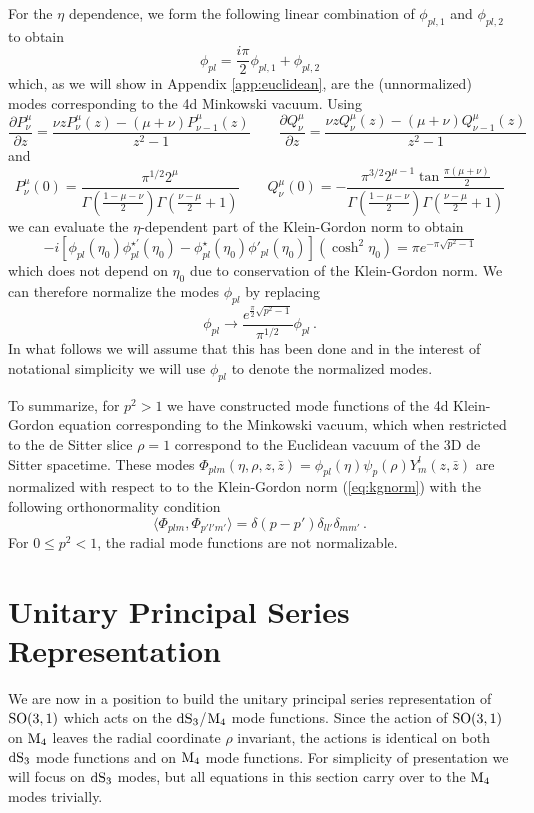 \documentclass{brownthesis}
\begin{document}
For the $\eta$ dependence, we form the following linear combination
of $\phi_{pl,1}$ and $\phi_{pl,2}$ to obtain
\[
\phi_{pl}=\frac{i\pi}{2}\phi_{pl,1}+\phi_{pl,2}
\]
which, as we will show in Appendix \ref{app:euclidean}, are the (unnormalized)
modes corresponding to the 4d Minkowski vacuum. Using
\[
\frac{\partial P_{\nu}^{\mu}}{\partial z}=\frac{\nu zP_{\nu}^{\mu}(z)-(\mu+\nu)P_{\nu-1}^{\mu}(z)}{z^{2}-1}\qquad\frac{\partial Q_{\nu}^{\mu}}{\partial z}=\frac{\nu zQ_{\nu}^{\mu}(z)-(\mu+\nu)Q_{\nu-1}^{\mu}(z)}{z^{2}-1}
\]
and
\[
P_{\nu}^{\mu}(0)=\frac{\pi^{1/2}2^{\mu}}{\Gamma\left(\frac{1-\mu-\nu}{2}\right)\Gamma\left(\frac{\nu-\mu}{2}+1\right)}\qquad Q_{\nu}^{\mu}(0)=-\frac{\pi^{3/2}2^{\mu-1}\tan\frac{\pi(\mu+\nu)}{2}}{\Gamma\left(\frac{1-\mu-\nu}{2}\right)\Gamma\left(\frac{\nu-\mu}{2}+1\right)}
\]
we can evaluate the $\eta$-dependent part of the Klein-Gordon norm
to obtain
\[
-i[\phi_{pl}(\eta_{0})\phi_{pl}^{\star'}(\eta_{0})-\phi_{pl}^{\star}(\eta_{0})\phi'_{pl}(\eta_{0})](\cosh^{2}\eta_{0})=\pi e^{-\pi\sqrt{p^{2}-1}}
\]
which does not depend on $\eta_{0}$ due to conservation of the Klein-Gordon
norm. We can therefore normalize the modes $\phi_{pl}$ by replacing
\[
\phi_{pl}\to\frac{e^{\frac{\pi}{2}\sqrt{p^{2}-1}}}{\pi^{1/2}}\phi_{pl}\,.
\]
In what follows we will assume that this has been done and in the
interest of notational simplicity we will use $\phi_{pl}$ to denote
the normalized modes.

To summarize, for $p^{2}>1$ we have constructed mode functions of
the 4d Klein-Gordon equation corresponding to the Minkowski vacuum,
which when restricted to the de Sitter slice $\rho=1$ correspond
to the Euclidean vacuum of the 3D de Sitter spacetime. These modes
$\Phi_{plm}(\eta,\rho,z,\bar{z})=\phi_{pl}(\eta)\psi_{p}(\rho)Y_{m}^{l}(z,\bar{z})$
are normalized with respect to to the Klein-Gordon norm (\ref{eq:kgnorm})
with the following orthonormality condition
\[
\langle\Phi_{plm},\Phi_{p'l'm'}\rangle=\delta(p-p')\delta_{ll'}\delta_{mm'}\,.
\]
For $0\le p^{2}<1$, the radial mode functions are not normalizable.

\section{Unitary Principal Series Representation}

\label{sec:ups} We are now in a position to build the unitary principal
series representation of ${\rm SO(3,1)}$ which acts on the ${\rm dS_{3}}$/${\rm M_{4}}$
mode functions. Since the action of ${\rm SO(3,1)}$ on ${\rm M_{4}}$
leaves the radial coordinate $\rho$ invariant, the actions is identical
on both ${\rm dS_{3}}$ mode functions and on ${\rm M_{4}}$ mode
functions. For simplicity of presentation we will focus on ${\rm dS_{3}}$
modes, but all equations in this section carry over to the ${\rm M_{4}}$
modes trivially.
\end{document}
